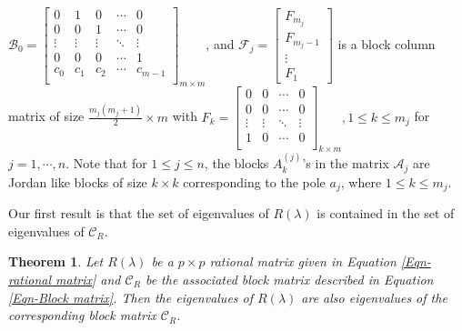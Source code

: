 \documentclass[12pt, reqno]{amsart}
\newtheorem{theorem}{Theorem}[section]
\theoremstyle{definition}
\theoremstyle{remark}
\numberwithin{equation}{section}
\begin{document}
$\mathcal{B}_0 = \begin{bmatrix}
0 & 1 & 0 & \cdots & 0\\
0 & 0 & 1 & \cdots & 0\\
\vdots & \vdots & \vdots & \ddots & \vdots\\
0 & 0 & 0 & \cdots & 1\\
c_0 & c_1 & c_2 & \cdots & c_{m-1}\\ 
\end{bmatrix}_{m \times m}$, and
$\mathcal{F}_j = \begin{bmatrix}
F_{m_j} \\
F_{m_j-1} \\
\vdots \\
F_1
\end{bmatrix}$ is a block column matrix of size $\displaystyle \frac{m_j(m_j+1)}{2} 
\times m$ with $ F_k =\begin{bmatrix}
0 & 0 & \cdots & 0\\
0 & 0 & \cdots & 0\\
\vdots & \vdots & \ddots & \vdots \\
1 & 0 & \cdots & 0 \\
\end{bmatrix}_{k \times m}, 1 \leq k \leq m_j$ for $j = 1,\cdots, n$. 
Note that for $1 \leq j \leq n$, the blocks $A_k^{(j)}$'s in the matrix $\mathcal{A}_j$ are Jordan like blocks of size $k \times k$ corresponding to the pole $a_j$, where $1 \leq k \leq m_j$.

\medskip
Our first result is that the set of eigenvalues of $R(\lambda)$ is contained 
in the set of eigenvalues of $\mathcal{C}_R$.

\begin{theorem}\label{Thm- eigenvalues- matrix rational function}
Let $R(\lambda)$ be a $p\times p$ rational matrix given in Equation 
\eqref{Eqn- rational matrix} and $\mathcal{C}_R$ be the associated block 
matrix described in Equation \eqref{Eqn-Block matrix}. Then the eigenvalues 
of $R(\lambda)$ are also eigenvalues of the corresponding block matrix
$\mathcal{C}_R$.
\end{theorem}
\end{document}
